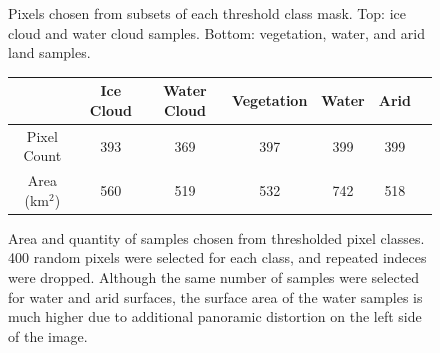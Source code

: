 \documentclass[12pt]{article}
\begin{document}
\begin{figure}[h!]
\begin{center}
{        }
    \end{center}

    \caption{Pixels chosen from subsets of each threshold class mask. Top: ice cloud and water cloud samples. Bottom: vegetation, water, and arid land samples.}
    \label{thresh_samples}
\end{figure}

\begin{figure}[h!]
    \centering
    \begin{tabular}{c|cccccc}
    & Ice Cloud & Water Cloud & Vegetation & Water & Arid \\
    \hline
    Pixel Count & 393 & 369 & 397 & 399 & 399\\
    Area (km$^2$) & 560 & 519 & 532 & 742 & 518\\
    \end{tabular}
    \caption{Area and quantity of samples chosen from thresholded pixel classes. 400 random pixels were selected for each class, and repeated indeces were dropped. Although the same number of samples were selected for water and arid surfaces, the surface area of the water samples is much higher due to additional panoramic distortion on the left side of the image.}
    \label{sample_thresh_areas}
\end{figure}


\clearpage
\end{document}

